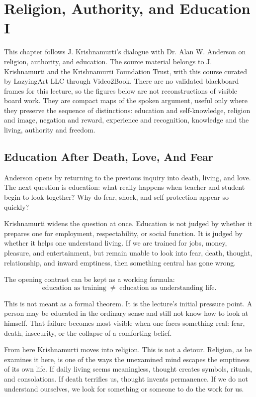 \chapter{Religion, Authority, and Education I}

This chapter follows J. Krishnamurti's dialogue with Dr. Alan W. Anderson on religion, authority, and education. The source material belongs to J. Krishnamurti and the Krishnamurti Foundation Trust, with this course curated by LazyingArt LLC through Video2Book. There are no validated blackboard frames for this lecture, so the figures below are not reconstructions of visible board work. They are compact maps of the spoken argument, useful only where they preserve the sequence of distinctions: education and self-knowledge, religion and image, negation and reward, experience and recognition, knowledge and the living, authority and freedom.

\section{Education After Death, Love, And Fear}

Anderson opens by returning to the previous inquiry into death, living, and love. The next question is education: what really happens when teacher and student begin to look together? Why do fear, shock, and self-protection appear so quickly?

Krishnamurti widens the question at once. Education is not judged by whether it prepares one for employment, respectability, or social function. It is judged by whether it helps one understand living. If we are trained for jobs, money, pleasure, and entertainment, but remain unable to look into fear, death, thought, relationship, and inward emptiness, then something central has gone wrong.

The opening contrast can be kept as a working formula:
\begin{equation}
\text{education as training}
\;\not=\;
\text{education as understanding life}.
\end{equation}

This is not meant as a formal theorem. It is the lecture's initial pressure point. A person may be educated in the ordinary sense and still not know how to look at himself. That failure becomes most visible when one faces something real: fear, death, insecurity, or the collapse of a comforting belief.

From here Krishnamurti moves into religion. This is not a detour. Religion, as he examines it here, is one of the ways the unexamined mind escapes the emptiness of its own life. If daily living seems meaningless, thought creates symbols, rituals, and consolations. If death terrifies us, thought invents permanence. If we do not understand ourselves, we look for something or someone to do the work for us.

